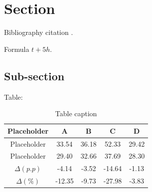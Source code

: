 \documentclass[12pt]{article}
\begin{document}

\tableofcontents

\newpage


\listoffigures

\newpage

\listoftables

\newpage


\section{Section}

\blindtext

Bibliography citation \cite{einstein}.

Formula $t + 5h$.


\subsection{Sub-section}

\blindtext[2]

Table:

\begin{table}[H]
	\centering
	\begin{tabular}{|c|c|c|c|c|}
		\hline
		\textbf{Placeholder}    & \textbf{A} 	 & \textbf{B} 	& \textbf{C}   & \textbf{D} 		\\ \hline
		Placeholder          	& 33.54          & 36.18        & 52.33        & 29.42              \\ \hline
		Placeholder             & 29.40          & 32.66        & 37.69        & 28.30              \\ \hline
		$\Delta (p.p)$     		& -4.14          & -3.52        & -14.64       & -1.13              \\ \hline
		$\Delta (\%)$      		& -12.35         & -9.73        & -27.98       & -3.83              \\ \hline
	\end{tabular}
\caption{Table caption}
\end{table}
\end{document}
